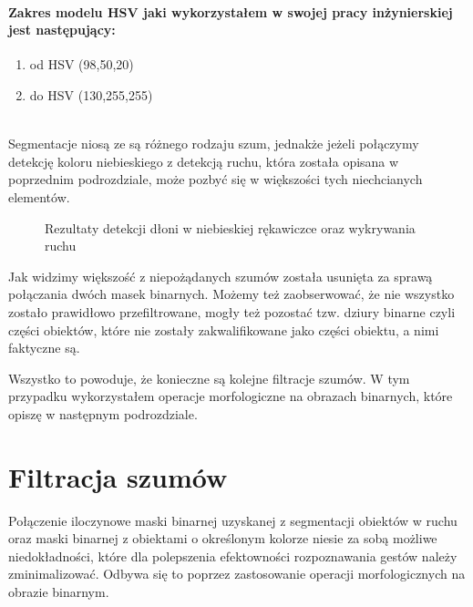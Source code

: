 \documentclass[a4paper,12pt,twoside,openany]{report}
\newcommand{\ImgPath}{.}
\begin{document}
\paragraph{Zakres modelu HSV jaki wykorzystałem w swojej pracy inżynierskiej jest następujący:}
\begin{enumerate}
	\item od HSV (98,50,20)
	\item do HSV (130,255,255)
\end{enumerate}
\mbox{} \\

Segmentacje niosą ze są różnego rodzaju szum, jednakże jeżeli połączymy detekcję koloru niebieskiego z detekcją ruchu, która została opisana w poprzednim podrozdziale, może pozbyć się w większości tych niechcianych elementów. 

\begin{figure}[H]
	\centering
	\caption{Rezultaty detekcji dłoni w niebieskiej rękawiczce oraz wykrywania ruchu}
\end{figure}

Jak widzimy większość z niepożądanych szumów została usunięta za sprawą połączania dwóch masek binarnych. Możemy też zaobserwować, że nie wszystko zostało prawidłowo przefiltrowane, mogły też pozostać tzw. dziury binarne czyli części obiektów, które nie zostały zakwalifikowane jako części obiektu, a nimi faktyczne są. 

Wszystko to powoduje, że konieczne są kolejne filtracje szumów. W tym przypadku wykorzystałem operacje morfologiczne na obrazach binarnych, które opiszę w następnym podrozdziale.  

\section{Filtracja szumów}
Połączenie iloczynowe maski binarnej uzyskanej z segmentacji obiektów w ruchu oraz maski binarnej z obiektami o określonym kolorze niesie za sobą możliwe niedokładności, które dla polepszenia efektowności rozpoznawania gestów należy zminimalizować. Odbywa się to poprzez zastosowanie operacji morfologicznych na obrazie binarnym. 
\end{document}
